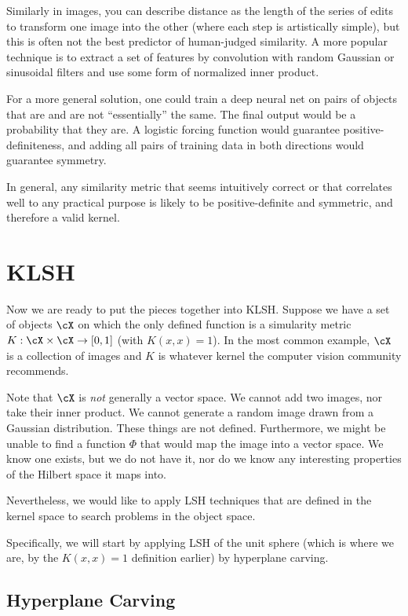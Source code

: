 \documentclass[twoside,11pt]{homework}
\begin{document}
Similarly in images, you can describe distance as the length of the
series of edits to transform one image into the other (where each step
is artistically simple), but this is often not the best predictor of
human-judged similarity.  A more popular technique is to extract a set
of features by convolution with random Gaussian or sinusoidal filters
and use some form of normalized inner product.

For a more general solution, one could train a deep neural net on
pairs of objects that are and are not ``essentially'' the same.  The
final output would be a probability that they are.  A logistic forcing
function would guarantee positive-definiteness, and adding all pairs
of training data in both directions would guarantee symmetry.

In general, any similarity metric that seems intuitively correct or
that correlates well to any practical purpose is likely to be
positive-definite and symmetric, and therefore a valid kernel.

\section{KLSH}

Now we are ready to put the pieces together into KLSH.  Suppose we
have a set of objects $\cX$ on which the only defined function is a
simularity metric $K:\cX \times \cX \rightarrow [0,1]$ (with
$K(x,x)=1$).  In the most
common example, $\cX$ is a collection of images and $K$ is whatever
kernel the computer
vision community recommends.

Note that $\cX$ is \emph{not} generally a vector space.  We cannot add two
images, nor take their inner product.  We cannot generate a random
image drawn from a Gaussian distribution.  These things are not
defined.  Furthermore, we might be unable to find a function $\Phi$ that would map
the image into a vector space.  We know one exists, but we do not have
it, nor do we know any interesting properties of the Hilbert space it
maps into.

Nevertheless, we would like to apply LSH techniques that are defined
in the kernel space to search problems in the object space.

Specifically, we will start by applying LSH of the unit sphere (which
is where we are, by the $K(x,x)=1$ definition earlier) by hyperplane
carving.

\subsection{Hyperplane Carving}
\end{document}

